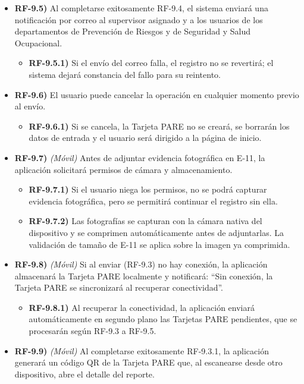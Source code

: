 \begin{itemize}[label={}, leftmargin=1.5em]
\begin{itemize}[label={}, leftmargin=1.5em]
    \item \textbf{RF-9.4.1)} Si RF-14 notifica un fallo, el sistema revertir\'a la creaci\'on de la Tarjeta PARE y de sus evidencias (rollback), notificar\'a: ``No se pudo completar el registro, intente nuevamente'' y no dejar\'a Tarjetas PARE sin Situaci\'on Cr\'itica asociada.
  \end{itemize}
  \item \textbf{RF-9.5)} Al completarse exitosamente RF-9.4, el sistema enviar\'a una notificaci\'on por correo al supervisor asignado y a los usuarios de los departamentos de Prevenci\'on de Riesgos y de Seguridad y Salud Ocupacional.
  \begin{itemize}[label={}, leftmargin=1.5em]
    \item \textbf{RF-9.5.1)} Si el env\'io del correo falla, el registro no se revertir\'a; el sistema dejar\'a constancia del fallo para su reintento.
  \end{itemize}
  \item \textbf{RF-9.6)} El usuario puede cancelar la operaci\'on en cualquier momento previo al env\'io.
  \begin{itemize}[label={}, leftmargin=1.5em]
    \item \textbf{RF-9.6.1)} Si se cancela, la Tarjeta PARE no se crear\'a, se borrar\'an los datos de entrada y el usuario ser\'a dirigido a la p\'agina de inicio.
  \end{itemize}
  \item \textbf{RF-9.7)} \textit{(M\'ovil)} Antes de adjuntar evidencia fotogr\'afica en E-11, la aplicaci\'on solicitar\'a permisos de c\'amara y almacenamiento.
  \begin{itemize}[label={}, leftmargin=1.5em]
    \item \textbf{RF-9.7.1)} Si el usuario niega los permisos, no se podr\'a capturar evidencia fotogr\'afica, pero se permitir\'a continuar el registro sin ella.
    \item \textbf{RF-9.7.2)} Las fotograf\'ias se capturan con la c\'amara nativa del dispositivo y se comprimen autom\'aticamente antes de adjuntarlas. La validaci\'on de tama\~no de E-11 se aplica sobre la imagen ya comprimida.
  \end{itemize}
  \item \textbf{RF-9.8)} \textit{(M\'ovil)} Si al enviar (RF-9.3) no hay conexi\'on, la aplicaci\'on almacenar\'a la Tarjeta PARE localmente y notificar\'a: ``Sin conexi\'on, la Tarjeta PARE se sincronizar\'a al recuperar conectividad''.
  \begin{itemize}[label={}, leftmargin=1.5em]
    \item \textbf{RF-9.8.1)} Al recuperar la conectividad, la aplicaci\'on enviar\'a autom\'aticamente en segundo plano las Tarjetas PARE pendientes, que se procesar\'an seg\'un RF-9.3 a RF-9.5.
  \end{itemize}
  \item \textbf{RF-9.9)} \textit{(M\'ovil)} Al completarse exitosamente RF-9.3.1, la aplicaci\'on generar\'a un c\'odigo QR de la Tarjeta PARE que, al escanearse desde otro dispositivo, abre el detalle del reporte.
\end{itemize}

